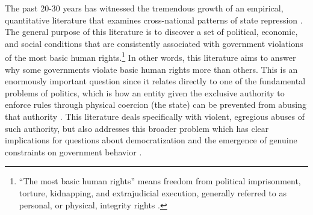 \documentclass[11pt]{article}
\begin{document}
The past 20-30 years has witnessed the tremendous growth of an empirical, quantitative literature that examines cross-national patterns of state repression \citep[See, e.g.,][]{Hibbs1973,Stohletal1986, Park1987, McCormickMitchell1988, Henderson1991, Henderson1993, PoeTate1994, Davenport1995, Fein1995, Davenport1999, CingranelliRichards1999isq, Keith1999, Poeetal1999, Apodaca2001, RichardsGellenySacko2001,  Hathaway2002, Keith2002PRQ, DavenportArmstrong2004, BDMetal2005, HafnerBurton2005jpr, HafnerBurtonTsutsui2005, Davenport2007AR, Davenport2007, KeithTatePoe2009, CingranelliFilippov2010, ConradMoore2010}. The general purpose of this literature is to discover a set of political, economic, and social conditions that are consistently associated with government violations of the most basic human rights.\footnote{``The most basic human rights'' means freedom from political imprisonment, torture, kidnapping, and extrajudicial execution, generally referred to as personal, or physical, integrity rights \citep[See, e.g.][]{PoeTate1994, CingranelliRichards1999isq}.} In other words, this literature aims to answer why some governments violate basic human rights more than others. This is an enormously important question since it relates directly to one of the fundamental problems of politics, which is how an entity given the exclusive authority to enforce rules through physical coercion (the state) can be prevented from abusing that authority \citep[See, e.g.,][]{Moore2010}. This literature deals specifically with violent, egregious abuses of such authority, but also addresses this broader problem which has clear implications for questions about democratization and the emergence of genuine constraints on government behavior \citep[E.g.,][]{NorthWeingast1989,Weingast1997}.
\end{document}
